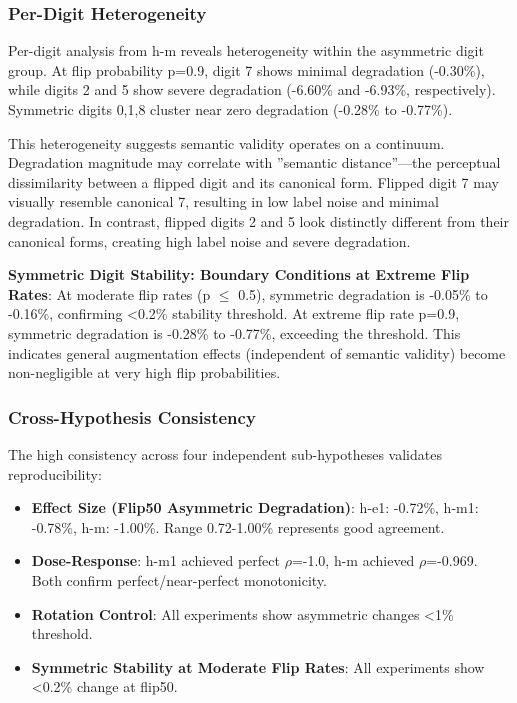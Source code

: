 \subsubsection{Per-Digit Heterogeneity}

Per-digit analysis from h-m reveals heterogeneity within the asymmetric digit group. At flip probability p=0.9, digit 7 shows minimal degradation (-0.30\%), while digits 2 and 5 show severe degradation (-6.60\% and -6.93\%, respectively). Symmetric digits {0,1,8} cluster near zero degradation (-0.28\% to -0.77\%).

This heterogeneity suggests semantic validity operates on a continuum. Degradation magnitude may correlate with ''semantic distance''---the perceptual dissimilarity between a flipped digit and its canonical form. Flipped digit 7 may visually resemble canonical 7, resulting in low label noise and minimal degradation. In contrast, flipped digits 2 and 5 look distinctly different from their canonical forms, creating high label noise and severe degradation.

\textbf{Symmetric Digit Stability: Boundary Conditions at Extreme Flip Rates}: At moderate flip rates (p $\leq$ 0.5), symmetric degradation is -0.05\% to -0.16\%, confirming <0.2\% stability threshold. At extreme flip rate p=0.9, symmetric degradation is -0.28\% to -0.77\%, exceeding the threshold. This indicates general augmentation effects (independent of semantic validity) become non-negligible at very high flip probabilities.

\subsubsection{Cross-Hypothesis Consistency}

The high consistency across four independent sub-hypotheses validates reproducibility:

\begin{itemize}
\item \textbf{Effect Size (Flip50 Asymmetric Degradation)}: h-e1: -0.72\%, h-m1: -0.78\%, h-m: -1.00\%. Range 0.72-1.00\% represents good agreement.
\item \textbf{Dose-Response}: h-m1 achieved perfect $\rho$=-1.0, h-m achieved $\rho$=-0.969. Both confirm perfect/near-perfect monotonicity.
\item \textbf{Rotation Control}: All experiments show asymmetric changes <1\% threshold.
\item \textbf{Symmetric Stability at Moderate Flip Rates}: All experiments show <0.2\% change at flip50.
\end{itemize}

